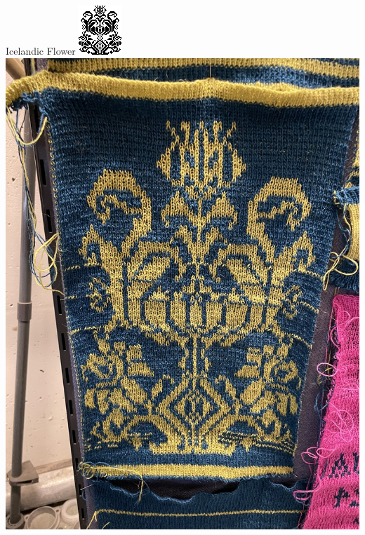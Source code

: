 \documentclass[
    NAME={Dr. Helga Ingimundardóttir},
    EMAIL={helgaingim@hi.is},
    FACULTY={Industrial Engineering},
    TITLE={HiDef Textiles: Reviving Tradition with Innovation},
    SUBTITLE={Empowering Creativity and Sustainability in Textile Production through Digital Transformation},
    SEMINAR={Reykjavík DataBeers},
    DATE={January 25, 2025},
    WIDE={true}
]{HI-LaTeX/hi-beamer}
\begin{document}
    \begin{frame}{Icelandic Flower}
        \centering
        \includegraphics[height=.7\textheight]{include/thjms5898_210.png}
        \hspace{24pt}
        \includegraphics[height=.7\textheight]{include/flower.jpg}
    \end{frame}
\end{document}
